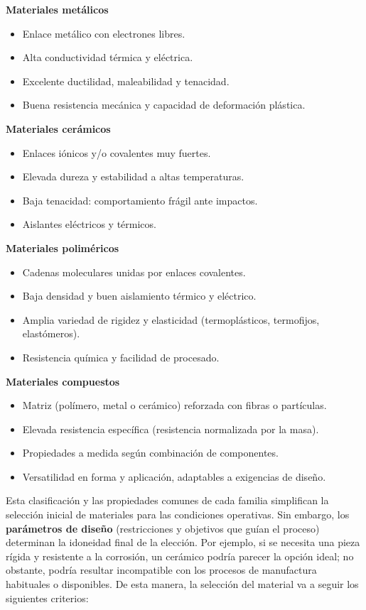 \textbf{Materiales metálicos}
    \begin{itemize}
      \item Enlace metálico con electrones libres.
      \item Alta conductividad térmica y eléctrica.
      \item Excelente ductilidad, maleabilidad y tenacidad.
      \item Buena resistencia mecánica y capacidad de deformación plástica.
    \end{itemize}

\textbf{Materiales cerámicos}
  
    \begin{itemize}
      \item Enlaces iónicos y/o covalentes muy fuertes.
      \item Elevada dureza y estabilidad a altas temperaturas.
      \item Baja tenacidad: comportamiento frágil ante impactos.
      \item Aislantes eléctricos y térmicos.
    \end{itemize}

\textbf{Materiales poliméricos}
  
    \begin{itemize}
      \item Cadenas moleculares unidas por enlaces covalentes.
      \item Baja densidad y buen aislamiento térmico y eléctrico.
      \item Amplia variedad de rigidez y elasticidad (termoplásticos, termofijos, elastómeros).
      \item Resistencia química y facilidad de procesado.
    \end{itemize}

\textbf{Materiales compuestos}
  
    \begin{itemize}
      \item Matriz (polímero, metal o cerámico) reforzada con fibras o partículas.
      \item Elevada resistencia específica (resistencia normalizada por la masa).
      \item Propiedades a medida según combinación de componentes.
      \item Versatilidad en forma y aplicación, adaptables a exigencias de diseño.
    \end{itemize}

Esta clasificación y las propiedades comunes de cada familia simplifican la selección inicial de materiales para las condiciones operativas. Sin embargo, los \textbf{parámetros de diseño} (restricciones y objetivos que guían el proceso) determinan la idoneidad final de la elección. Por ejemplo, si se necesita una pieza rígida y resistente a la corrosión, un cerámico podría parecer la opción ideal; no obstante, podría resultar incompatible con los procesos de manufactura habituales o disponibles. De esta manera, la selección del material va a seguir los siguientes criterios:

